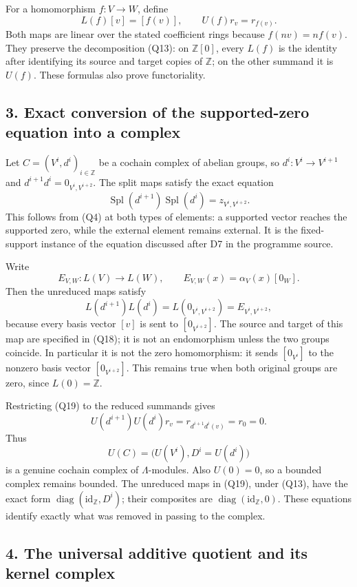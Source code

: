 \documentclass[
]{article}
\begin{document}
For a homomorphism \(f:V\to W\), define \[
L(f)[v]=[f(v)],\qquad U(f)r_v=r_{f(v)}.
\tag{Q16}
\] Both maps are linear over the stated coefficient rings because
\(f(nv)=nf(v)\). They preserve the decomposition (Q13): on
\(\mathbb Z[0]\), every \(L(f)\) is the identity after identifying its
source and target copies of \(\mathbb Z\); on the other summand it is
\(U(f)\). These formulas also prove functoriality.

\subsection{3. Exact conversion of the supported-zero equation into a
complex}\label{exact-conversion-of-the-supported-zero-equation-into-a-complex}

Let \(C=(V^i,d^i)_{i\in\mathbb Z}\) be a cochain complex of abelian
groups, so \(d^i:V^i\to V^{i+1}\) and \(d^{i+1}d^i=0_{V^i,V^{i+2}}\).
The split maps satisfy the exact equation \[
\operatorname{Spl}(d^{i+1})\operatorname{Spl}(d^i)
=z_{V^i,V^{i+2}}.
\tag{Q17}
\] This follows from (Q4) at both types of elements: a supported vector
reaches the supported zero, while the external element remains external.
It is the fixed-support instance of the equation discussed after D7 in
the programme source.

Write \[
E_{V,W}:L(V)\to L(W),\qquad
E_{V,W}(x)=\alpha_V(x)[0_W].
\tag{Q18}
\] Then the unreduced maps satisfy \[
L(d^{i+1})L(d^i)=L(0_{V^i,V^{i+2}})=E_{V^i,V^{i+2}},
\tag{Q19}
\] because every basis vector \([v]\) is sent to \([0_{V^{i+2}}]\). The
source and target of this map are specified in (Q18); it is not an
endomorphism unless the two groups coincide. In particular it is not the
zero homomorphism: it sends \([0_{V^i}]\) to the nonzero basis vector
\([0_{V^{i+2}}]\). This remains true when both original groups are zero,
since \(L(0)=\mathbb Z\).

Restricting (Q19) to the reduced summands gives \[
U(d^{i+1})U(d^i)r_v=r_{d^{i+1}d^i(v)}=r_0=0.
\tag{Q20}
\] Thus \[
U(C)=\bigl(U(V^i),D^i=U(d^i)\bigr)
\tag{Q21}
\] is a genuine cochain complex of \(\Lambda\)-modules. Also \(U(0)=0\),
so a bounded complex remains bounded. The unreduced maps in (Q19), under
(Q13), have the exact form
\(\operatorname{diag}(\mathrm{id}_{\mathbb Z},D^i)\); their composites
are \(\operatorname{diag}(\mathrm{id}_{\mathbb Z},0)\). These equations
identify exactly what was removed in passing to the complex.

\subsection{4. The universal additive quotient and its kernel
complex}\label{the-universal-additive-quotient-and-its-kernel-complex}
\end{document}
